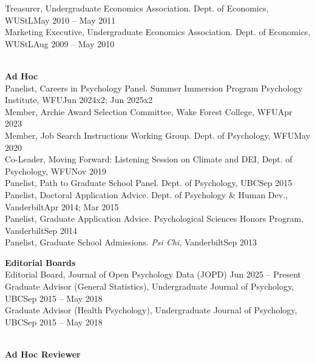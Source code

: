 \begin{minipage}{\linewidth}\vspace{1.1mm} Treasurer, Undergraduate Economics Association. Dept. of Economics, WUStL\hfill{May 2010 – May 2011}\\
Marketing Executive, Undergraduate Economics Association. Dept. of Economics, WUStL\hfill {Aug 2009 – May 2010}\end{minipage}\medskip\\
\textrm{\textbf{Ad Hoc}}\\
Panelist, Careers in Psychology Panel. Summer Immersion Program Psychology Institute, WFU\hfill {Jun 2024x2; Jun 2025x2}\\ %
Member, Archie Award Selection Committee, Wake Forest College, WFU\hfill{Apr 2023}\\ 
Member, Job Search Instructions Working Group. Dept. of Psychology, WFU\hfill{May 2020}\\
Co-Leader, Moving Forward: Listening Session on Climate and DEI, Dept. of Psychology, WFU\hfill {Nov 2019}\\
Panelist, Path to Graduate School Panel. Dept. of Psychology, UBC\hfill {Sep 2015}\\
Panelist, Doctoral Application Advice. Dept. of Psychology \& Human Dev., Vanderbilt\hfill {Apr 2014; Mar 2015}\\
Panelist, Graduate Application Advice. Psychological Sciences Honors Program, Vanderbilt\hfill {Sep 2014}\\
Panelist, Graduate School Admissions. \textit{Psi Chi}, Vanderbilt\hfill{Sep 2013}\medskip\\
%
%
\begin{minipage}{\linewidth}\vspace{1.1mm} {\large \textbf{Editorial Boards}}\\
Editorial Board, Journal of Open Psychology Data (JOPD) \hfill{Jun 2025 – Present}\\
Graduate Advisor (General Statistics), Undergraduate Journal of Psychology, UBC\hfill{Sep 2015 – May 2018}\\
Graduate Advisor (Health Psychology), Undergraduate Journal of Psychology, UBC\hfill{Sep 2015 – May 2018}\end{minipage}\medskip\\
{\large \textbf{Ad Hoc Reviewer}}\smallskip\\
